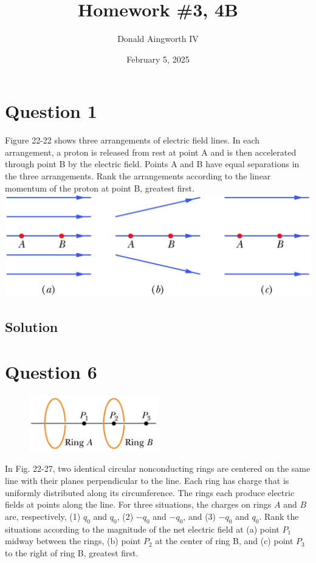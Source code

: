 \documentclass[12pt]{article}
\title{Homework \#3, 4B}
\author{Donald Aingworth IV}
\date{February 5, 2025}
\begin{document}

\maketitle

\pagebreak
\section{Question 1}
Figure 22-22 shows three arrangements of electric field lines. In each arrangement, a proton is released from rest at point A and is then accelerated through point B by the electric field. Points A and B have equal separations in the three arrangements. Rank the arrangements according to the linear momentum of the proton at point B, greatest first.\\
\includegraphics[width=\textwidth]{picture_1.png}

\subsection*{Solution}


\pagebreak
\section{Question 6}
\begin{figure}
    \vspace{-30pt}
    \includegraphics[width=0.5\textwidth]{picture_2.png} 
\end{figure}
In Fig. 22-27, two identical circular nonconducting rings are centered on the same line with their planes perpendicular to the line. Each ring has charge that is uniformly distributed along its circumference. The rings each produce electric fields at points along the line. For three situations, the charges on rings $A$ and $B$ are, respectively, (1) $q_0$ and $q_0$, (2) $-q_0$ and $-q_0$, and (3) $-q_0$ and $q_0$. Rank the situations according to the magnitude of the net electric field at (a) point $P_1$ midway between the rings, (b) point $P_2$ at the center of ring B, and (c) point $P_3$ to the right of ring B, greatest first.
\end{document}

